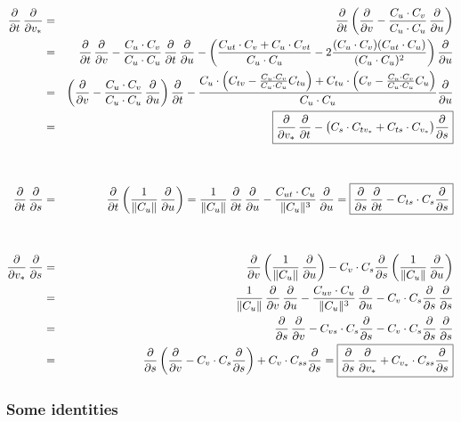 \documentclass[twoside,a4paper,english]{article}
\def\v{{v_*}}
\newcommand\pderiv[2][]{\frac{\partial #1}{\partial #2}}
\begin{document}
\begin{eqnarray}
  \pderiv{t}\,\pderiv{\v}
  &=& \nonumber
   \pderiv{t}
   \left(\pderiv{v}-\frac{C_u\cdot C_v}{C_u\cdot C_u}\,\pderiv{u}\right)
  \\ &=& \nonumber
   \pderiv{t}\,\pderiv{v}
  -\frac{C_u\cdot C_v}{C_u\cdot C_u}\,\pderiv{t}\,\pderiv{u}
  -\left(\frac{C_{ut}\cdot C_v + C_u\cdot C_{vt}}{C_u\cdot C_u}
         -2\frac{(C_u\cdot C_v)(C_{ut}\cdot C_u)}{(C_u\cdot C_u)^2}\right)
   \pderiv{u}
  \\ &=& \nonumber
   \left(\pderiv{v}-\frac{C_u\cdot C_v}{C_u\cdot C_u}\,\pderiv{u}\right)
   \pderiv{t}
  -\frac{
     C_u\cdot\left(C_{tv}-\frac{C_u\cdot C_v}{C_u\cdot C_u}C_{tu}\right)
    +C_{tu}\cdot\left(C_v-\frac{C_u\cdot C_v}{C_u\cdot C_u}C_u\right)
   }{C_u\cdot C_u}
   \pderiv{u}
  \\ &=& \label{eq:com_tv}
  \fbox{$\displaystyle
   \pderiv{\v}\,\pderiv{t}
  -\big(C_s\cdot C_{t\v}+C_{ts}\cdot C_{\v}\big)\pderiv{s}
  $}
  \\ \nonumber \\ \nonumber \\
  \pderiv{t}\,\pderiv{s}
  &=& \label{eq:com_ts}
   \pderiv{t}\left(\frac{1}{\|C_u\|}\,\pderiv{u}\right)
  =\frac{1}{\|C_u\|}\,\pderiv{t}\,\pderiv{u}
  -\frac{C_{ut}\cdot C_u}{\|C_u\|^3}\,\pderiv{u}
  =\fbox{$\displaystyle
   \pderiv{s}\,\pderiv{t}-C_{ts}\cdot C_s\pderiv{s}
  $}
  \\ \nonumber \\ \nonumber \\
  \pderiv{\v}\,\pderiv{s}
  &=& \nonumber
   \pderiv{v}\left(\frac{1}{\|C_u\|}\,\pderiv{u}\right)
  -C_v\cdot C_s \pderiv{s}\left(\frac{1}{\|C_u\|}\,\pderiv{u}\right)
  \\ &=& \nonumber
   \frac{1}{\|C_u\|}\,\pderiv{v}\,\pderiv{u}
  -\frac{C_{uv}\cdot C_u}{\|C_u\|^3}\,\pderiv{u}
  -C_v\cdot C_s \pderiv{s}\,\pderiv{s}
  \\ &=& \nonumber
   \pderiv{s}\,\pderiv{v}
  -C_{vs}\cdot C_s \pderiv{s}
  -C_v\cdot C_s \pderiv{s}\,\pderiv{s}
  \\ &=& \label{eq:com_vs}
   \pderiv{s}\left(\pderiv{v}-C_v\cdot C_s \pderiv{s}\right)
  +C_v\cdot C_{ss}\pderiv{s}
  =\fbox{$\displaystyle
   \pderiv{s}\,\pderiv{\v}+C_{\v}\cdot C_{ss}\pderiv{s}
  $}
\end{eqnarray}

\subsubsection{Some identities}
\end{document}
